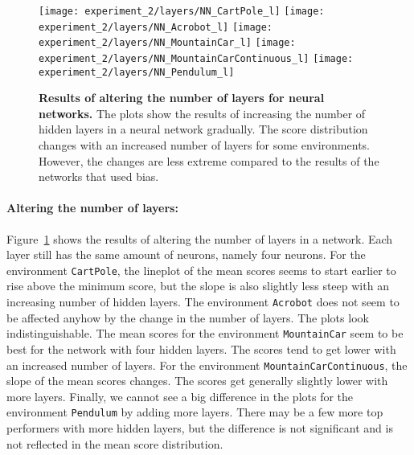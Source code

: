 \begin{figure}[!ht]
  \centering
\texttt{[image: experiment\_2/layers/NN\_CartPole\_l]}
\texttt{[image: experiment\_2/layers/NN\_Acrobot\_l]}
\texttt{[image: experiment\_2/layers/NN\_MountainCar\_l]}
\texttt{[image: experiment\_2/layers/NN\_MountainCarContinuous\_l]}
\texttt{[image: experiment\_2/layers/NN\_Pendulum\_l]}
\caption[Results of altering the number of layers for neural networks]{
  \textbf{Results of altering the number of layers for neural networks.}
   The plots show the results of increasing the number of hidden layers in a neural network gradually. The score distribution changes with an increased number of layers for some environments. However, the changes are less extreme compared to the results of the networks that used bias.
}
\label{fig:experiment_2_layers}
\end{figure}

\paragraph*{Altering the number of layers:} Figure~\ref{fig:experiment_2_layers} shows the results of altering the number of layers in a network. Each layer still has the same amount of neurons, namely four neurons. For the environment \verb|CartPole|, the lineplot of the mean scores seems to start earlier to rise above the minimum score, but the slope is also slightly less steep with an increasing number of hidden layers. The environment \verb|Acrobot| does not seem to be affected anyhow by the change in the number of layers. The plots look indistinguishable. The mean scores for the environment \verb|MountainCar| seem to be best for the network with four hidden layers. The scores tend to get lower with an increased number of layers. For the environment \verb|MountainCarContinuous|, the slope of the mean scores changes. The scores get generally slightly lower with more layers. Finally, we cannot see a big difference in the plots for the environment \verb|Pendulum| by adding more layers. There may be a few more top performers with more hidden layers, but the difference is not significant and is not reflected in the mean score distribution.

